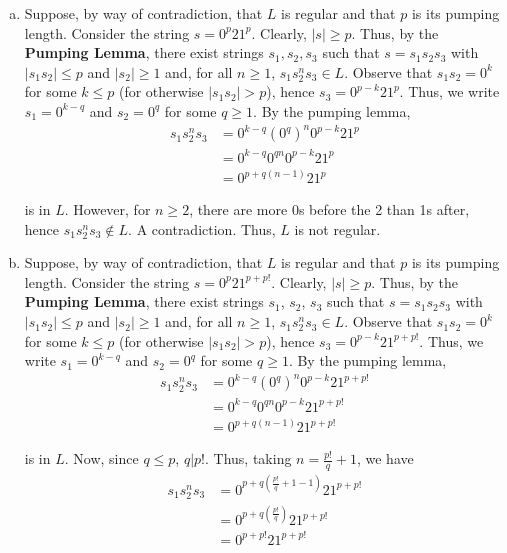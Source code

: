 \begin{solution}\mbox{\\}
\begin{enumerate}[(a)]
    \item Suppose, by way of contradiction, that \(L\) is regular and that \(p\) is its pumping length. Consider the string \(s=0^p21^p\). Clearly, \(|s|\geq p\). Thus, by the \textbf{Pumping Lemma}, there exist strings \(s_1, s_2, s_3\) such that \(s=s_1s_2s_3\) with \(|s_1s_2|\leq p\) and \(|s_2|\geq1\) and, for all \(n\geq 1\), \(s_1s_2^n s_3\in L\). Observe that \(s_1s_2=0^k\) for some \(k\leq p\) (for otherwise \(|s_1s_2| > p\)), hence \(s_3=0^{p-k}21^p\). Thus, we write \(s_1=0^{k-q}\) and \(s_2=0^{q}\) for some \(q\geq1\). By the pumping lemma, 
    \begin{align*}
        s_1s_2^n s_3 &= 0^{k-q}{(0^q)}^n0^{p-k}21^p\\
                    &= 0^{k-q}0^{qn}0^{p-k}21^p\\
                    &= 0^{p+q(n-1)}21^p
    \end{align*}

    is in \(L\). However, for \(n\geq2\), there are more 0s before the 2 than 1s after, hence \(s_1s_2^n s_3\not\in L\). A contradiction. Thus, \(L\) is not regular.

    \item Suppose, by way of contradiction, that \(L\) is regular and that \(p\) is its pumping length. Consider the string \(s=0^p21^{p+p!}\). Clearly, \(|s|\geq p\). Thus, by the \textbf{Pumping Lemma}, there exist strings \(s_1\), \(s_2\), \(s_3\) such that \(s=s_1s_2s_3\) with \(|s_1s_2|\leq p\) and \(|s_2|\geq1\) and, for all \(n\geq 1\), \(s_1s_2^n s_3\in L\). Observe that \(s_1s_2=0^k\) for some \(k\leq p\) (for otherwise \(|s_1s_2| > p\)), hence \(s_3=0^{p-k}21^{p+p!}\). Thus, we write \(s_1=0^{k-q}\) and \(s_2=0^{q}\) for some \(q\geq1\). By the pumping lemma, 
    \begin{align*}
        s_1s_2^n s_3 &= 0^{k-q}{(0^q)}^n0^{p-k}21^{p+p!}\\
                    &= 0^{k-q}0^{qn}0^{p-k}21^{p+p!}\\
                    &= 0^{p+q(n-1)}21^{p+p!}
    \end{align*}

    is in \(L\). Now, since \(q\leq p\), \(q|p{!}\). Thus, taking \(n=\frac{p!}{q}+1\), we have 
    \begin{align*}
        s_1s_2^n s_3 &= 0^{p+q(\frac{p!}{q}+1-1)}21^{p+p!}\\
                    &= 0^{p+q(\frac{p!}{q})}21^{p+p!}\\
                    &= 0^{p+p!}21^{p+p!}
    \end{align*}
    

\end{enumerate}
\end{solution}
